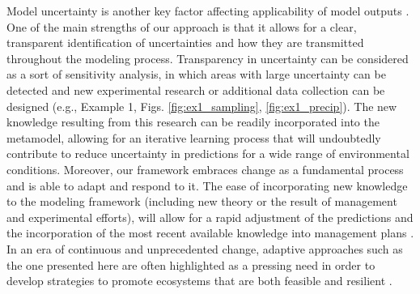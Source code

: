 Model uncertainty is another key factor affecting applicability of model outputs \citep{Addison2013}.
One of the main strengths of our approach is that it allows for a clear, transparent identification of uncertainties and how they are transmitted throughout the modeling process. 
Transparency in uncertainty can be considered as a sort of sensitivity analysis, in which areas with large uncertainty can be detected and new experimental research or additional data collection can be designed (e.g., Example 1, Figs. \ref{fig:ex1_sampling}, \ref{fig:ex1_precip}).
The new knowledge resulting from this research can be readily incorporated into the metamodel, allowing for an iterative learning process that will undoubtedly contribute to reduce uncertainty in predictions for a wide range of environmental conditions. 
Moreover, our framework embraces change as a fundamental process and is able to adapt and respond to it. 
The ease of incorporating new knowledge to the modeling framework (including new theory or the result of management and experimental efforts), will allow for a rapid adjustment of the predictions and the incorporation of the most recent available knowledge into management plans \citep{Keith2010}.
In an era of continuous and unprecedented change, adaptive approaches such as the one presented here are often highlighted as a pressing need in order to develop strategies to promote ecosystems that are both feasible and resilient \citep[Fig. \ref{fig:management};][]{Seastedt2008, Mori2013}.


